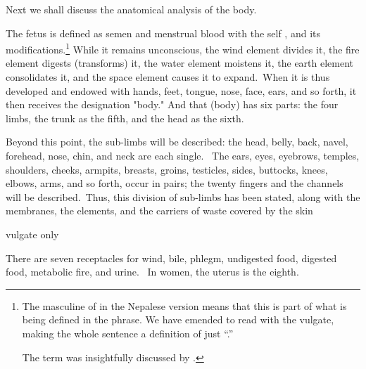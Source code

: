 \begin{translation}
  

      
\item[1]

Next we shall discuss the anatomical analysis of the body. 


\item[3]

The fetus is defined as semen and menstrual blood
 with the self
, and its
modifications.\footnote{The masculine of  in the
    Nepalese version means that this is part of what is being defined in
    the  phrase. We have emended to read with the vulgate, making
    the whole sentence a definition of just “.”
    
    The term  was insightfully discussed by
\citet{meul-2011}.} While it remains unconscious, the wind element
divides it, the fire element digests (transforms) it, the water
element moistens it, the earth element consolidates it, and the
space element causes it to expand. When it is thus developed and
endowed with hands, feet, tongue, nose, face, ears, and so forth,
it then receives the designation "body." And that (body) has six
parts: the four limbs, the trunk as the fifth, and the head as the
sixth.


  \begin{tt}
    \raggedright
    \bigskip
\item[4]
Beyond this point, the sub-limbs will be described: the head, belly, back, navel, forehead, nose, chin, and neck are each single.  The ears, eyes, eyebrows, temples, shoulders, cheeks, armpits, breasts, groins, testicles, sides, buttocks, knees, elbows, arms, and so forth, occur in pairs; the twenty fingers and the channels will be described. Thus, this division of sub-limbs has been stated, along with the membranes, the elements, and the carriers of waste  covered by the skin

\item[5, 6 and 7]  vulgate only

\item[8]

There are seven receptacles for wind, bile, phlegm, undigested food, digested food, metabolic fire, and urine.  In women, the uterus is the eighth. 

\item[9]


\end{tt}
\end{translation}
